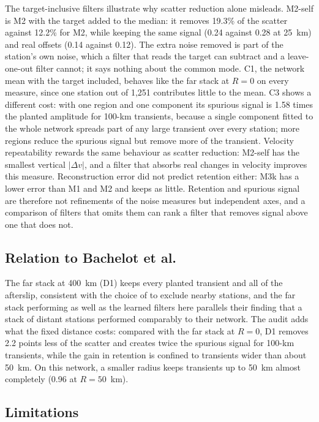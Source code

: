 The target-inclusive filters illustrate why scatter reduction alone misleads. M2-self is M2 with the target added to the median: it removes 19.3\% of the scatter against 12.2\% for M2, while keeping the same signal (0.24 against 0.28 at 25~km) and real offsets (0.14 against 0.12). The extra noise removed is part of the station's own noise, which a filter that reads the target can subtract and a leave-one-out filter cannot; it says nothing about the common mode. C1, the network mean with the target included, behaves like the far stack at $R = 0$ on every measure, since one station out of 1,251 contributes little to the mean. C3 shows a different cost: with one region and one component its spurious signal is 1.58 times the planted amplitude for 100-km transients, because a single component fitted to the whole network spreads part of any large transient over every station; more regions reduce the spurious signal but remove more of the transient. Velocity repeatability rewards the same behaviour as scatter reduction: M2-self has the smallest vertical $|\Delta v|$, and a filter that absorbs real changes in velocity improves this measure. Reconstruction error did not predict retention either: M3k has a lower error than M1 and M2 and keeps as little. Retention and spurious signal are therefore not refinements of the noise measures but independent axes, and a comparison of filters that omits them can rank a filter that removes signal above one that does not.

\subsection{Relation to Bachelot et al.}

The far stack at 400~km (D1) keeps every planted transient and all of the afterslip, consistent with the choice of \citet{bachelot2025} to exclude nearby stations, and the far stack performing as well as the learned filters here parallels their finding that a stack of distant stations performed comparably to their network. The audit adds what the fixed distance costs: compared with the far stack at $R = 0$, D1 removes 2.2 points less of the scatter and creates twice the spurious signal for 100-km transients, while the gain in retention is confined to transients wider than about 50~km. On this network, a smaller radius keeps transients up to 50~km almost completely (0.96 at $R = 50$~km).

\subsection{Limitations}

